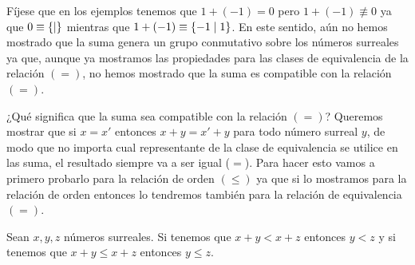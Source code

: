     F\'ijese que en los ejemplos tenemos que $1+(-1) = 0$ pero $1+(-1)\not\equiv 0$ ya que $0\equiv \left\{\mid \right\}$ mientras que $1+(-1)\equiv \left\{-1\mid 1\right\}$. En este sentido, a\'un no hemos mostrado que la suma genera un grupo conmutativo sobre los n\'umeros surreales ya que, aunque ya mostramos las propiedades para las clases de equivalencia de la relaci\'on $(=)$, no hemos mostrado que la suma es compatible con la relaci\'on $(=)$.
    
    ¿Qué significa que la suma sea compatible con la relaci\'on $(=)$? Queremos mostrar que si $x = x'$ entonces $x+y = x'+y$ para todo n\'umero surreal $y$, de modo que no importa cual representante de la clase de equivalencia se utilice en las suma, el resultado siempre va a ser igual ($=$). Para hacer esto vamos a primero probarlo para la relaci\'on de orden $(\le)$ ya que si lo mostramos para la relaci\'on de orden entonces lo tendremos tambi\'en para la relaci\'on de equivalencia $(=)$.

    \begin{theorem}[Cancelaci\'on]
        Sean $x,y, z$ n\'umeros surreales. Si tenemos que $x+y < x+z$ entonces $y < z$ y si tenemos que $x+y\le x+z$ entonces $y\le z$.
    \end{theorem}


